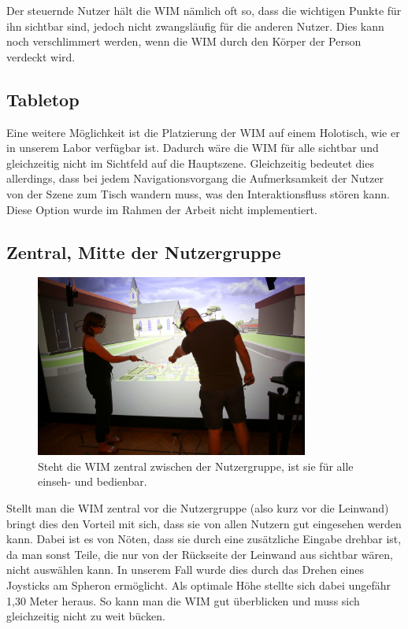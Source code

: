 Der steuernde Nutzer hält die WIM nämlich oft so, dass die wichtigen Punkte für ihn sichtbar sind, jedoch nicht zwangsläufig für die anderen Nutzer. Dies kann noch verschlimmert werden, wenn die WIM durch den Körper der Person verdeckt wird.


\subsection{Tabletop}
Eine weitere Möglichkeit ist die Platzierung der WIM auf einem Holotisch, wie er in unserem Labor verfügbar ist.
Dadurch wäre die WIM für alle sichtbar und gleichzeitig nicht im Sichtfeld auf die Hauptszene. Gleichzeitig bedeutet dies allerdings, dass bei jedem Navigationsvorgang die Aufmerksamkeit der Nutzer von der Szene zum Tisch wandern muss, was den Interaktionsfluss stören kann. Diese Option wurde im Rahmen der Arbeit nicht implementiert.

\subsection{Zentral, Mitte der Nutzergruppe}


\begin{figure}[h!]
  \centering
  \includegraphics[width=0.8\textwidth]{images/wim_zentral.JPG}
  \caption{Steht die WIM zentral zwischen der Nutzergruppe, ist sie für alle einseh- und bedienbar.}
  \label{fig:todo}
\end{figure}

Stellt man die WIM zentral vor die Nutzergruppe (also kurz vor die Leinwand) bringt dies den Vorteil mit sich, dass sie von allen Nutzern gut eingesehen werden kann.
Dabei ist es von Nöten, dass sie durch eine zusätzliche Eingabe drehbar ist, da man sonst Teile, die nur von der Rückseite der Leinwand aus sichtbar wären, nicht auswählen kann.
In unserem Fall wurde dies durch das Drehen eines Joysticks am Spheron ermöglicht.
Als optimale Höhe stellte sich dabei ungefähr 1,30 Meter heraus. So kann man die WIM gut überblicken und muss sich gleichzeitig nicht zu weit bücken.

